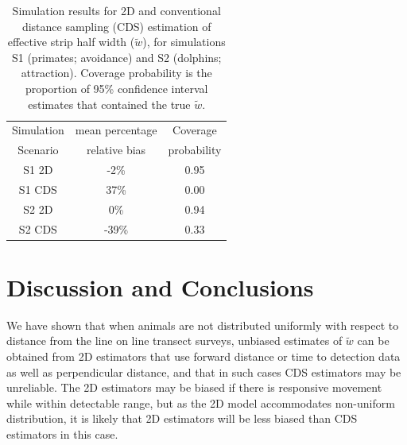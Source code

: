 \documentclass[useAMS,usenatbib,referee]{biom}
\begin{document}
\begin{table}[ht]
\caption{Simulation results for 2D and conventional distance sampling (CDS) estimation of effective strip half width ($\tilde{w}$), for simulations S1 (primates; avoidance) and S2 (dolphins; attraction). Coverage probability is the proportion of 95\% confidence interval estimates that contained the true $\tilde{w}$.} \label{tab:simResults}
\begin{tabular}{ccc}
  \hline
Simulation & mean percentage  & Coverage \\ 
Scenario  & relative bias & probability \\
  \hline
S1 2D  &  -2\% & 0.95 \\ 
S1 CDS &  37\% & 0.00 \\ 
S2 2D  &   0\% & 0.94 \\ 
S2 CDS & -39\% & 0.33 \\ 
   \hline
\end{tabular}
\end{table}



\section{Discussion and Conclusions}

We have shown that when animals are not distributed uniformly with respect to distance from the line on line transect surveys, unbiased estimates of $\tilde{w}$ can be obtained from 2D estimators that use forward distance or time to detection data as well as perpendicular distance, and that in such cases CDS estimators may be unreliable. The 2D estimators may be biased if there is responsive movement while within detectable range, but as the 2D model accommodates non-uniform distribution, it is likely that 2D estimators will be less biased than CDS estimators in this case.
\end{document}
